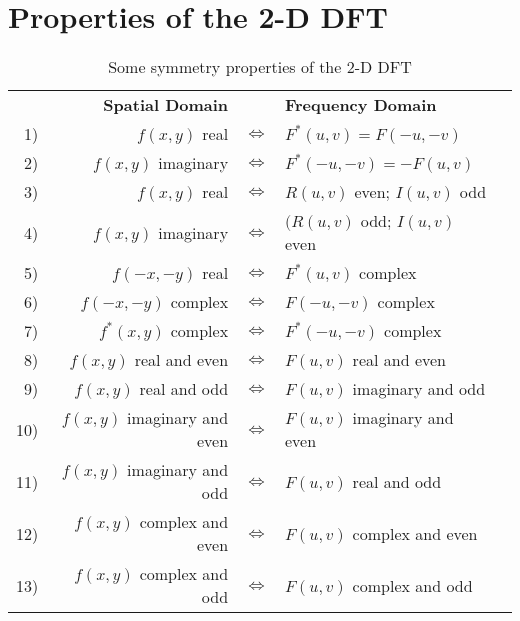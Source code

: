 \appendix
\section{Properties of the 2-D DFT}

\begin{table}[htbp]
	\centering
	\begin{tabular}{|rrllp{0.1cm}|}
	\hline
	& \textbf{Spatial Domain} & & \textbf{Frequency Domain} & \\
	1) & $f(x,y)$ real & $\Leftrightarrow$ & $F^*(u,v) = F(-u,-v)$ & \\
	2) & $f(x,y)$ imaginary & $\Leftrightarrow$ & $F^*(-u,-v) = -F(u,v)$ & \\
	3) & $f(x,y)$ real & $\Leftrightarrow$ & $R(u,v)$ even; $I(u,v)$ odd & \\
	4) & $f(x,y)$ imaginary & $\Leftrightarrow$ & $(R(u,v)$ odd; $I(u,v)$ even & \\
	5) & $f(-x,-y)$ real & $\Leftrightarrow$ & $F^*(u,v)$ complex & \\
	6) & $f(-x,-y)$ complex & $\Leftrightarrow$ & $F(-u,-v)$ complex & \\
	7) & $f^*(x,y)$ complex & $\Leftrightarrow$ & $F^*(-u,-v)$ complex & \\
	8) & $f(x,y)$ real and even & $\Leftrightarrow$ & $F(u,v)$ real and even & \\
	9) & $f(x,y)$ real and odd & $\Leftrightarrow$ & $F(u,v)$ imaginary and odd & \\
	10) & $f(x,y)$ imaginary and even & $\Leftrightarrow$ & $F(u,v)$ imaginary and even & \\
	11) & $f(x,y)$ imaginary and odd & $\Leftrightarrow$ & $F(u,v)$ real and odd & \\
	12) & $f(x,y)$ complex and even & $\Leftrightarrow$ & $F(u,v)$ complex and even & \\
	13) & $f(x,y)$ complex and odd & $\Leftrightarrow$ & $F(u,v)$ complex and odd & \\
	\hline
	\end{tabular}
	\caption{Some symmetry properties of the 2-D DFT}
	\label{tab:Symmetry_2D_DFT}
\end{table}

